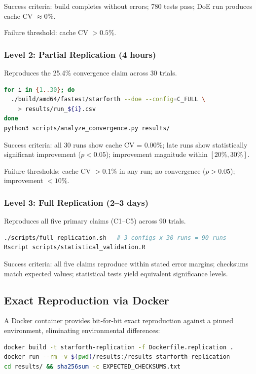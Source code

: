 Success criteria: build completes without errors; 780\raisebox{0.5ex}{+}
tests pass; DoE run produces cache CV $\approx 0\%$.

Failure threshold: cache CV $> 0.5\%$.

\subsubsection{Level 2: Partial Replication (4 hours)}

Reproduces the 25.4\% convergence claim across 30 trials.

\begin{lstlisting}[language=bash]
for i in {1..30}; do
  ./build/amd64/fastest/starforth --doe --config=C_FULL \
    > results/run_${i}.csv
done
python3 scripts/analyze_convergence.py results/
\end{lstlisting}

Success criteria: all 30 runs show cache CV = 0.00\%; late runs show
statistically significant improvement ($p < 0.05$); improvement magnitude
within $[20\%, 30\%]$.

Failure thresholds: cache CV $> 0.1\%$ in any run; no convergence
($p > 0.05$); improvement $< 10\%$.

\subsubsection{Level 3: Full Replication (2--3 days)}

Reproduces all five primary claims (C1--C5) across 90 trials.

\begin{lstlisting}[language=bash]
./scripts/full_replication.sh   # 3 configs x 30 runs = 90 runs
Rscript scripts/statistical_validation.R
\end{lstlisting}

Success criteria: all five claims reproduce within stated error margins;
checksums match expected values; statistical tests yield equivalent
significance levels.

\subsection{Exact Reproduction via Docker}

A Docker container provides bit-for-bit exact reproduction against a pinned
environment, eliminating environmental differences:

\begin{lstlisting}[language=bash]
docker build -t starforth-replication -f Dockerfile.replication .
docker run --rm -v $(pwd)/results:/results starforth-replication
cd results/ && sha256sum -c EXPECTED_CHECKSUMS.txt
\end{lstlisting}

